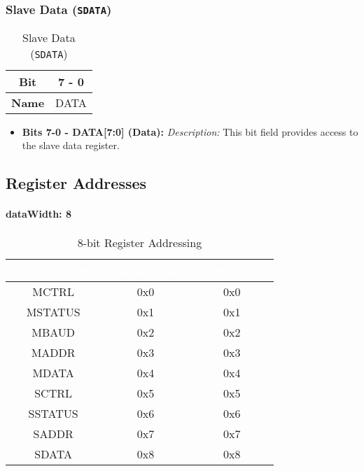       \subsubsection{Slave Data (\texttt{SDATA})}
      \label{sec:sdata}
    
      \begin{table}[H]
        \centering
        \caption{Slave Data (\texttt{SDATA})}
        \begin{tabular}{@{}cc@{}}
            \toprule
            \textbf{Bit} & 7 - 0 \\ \midrule
            \textbf{Name} & DATA \\ \bottomrule
        \end{tabular}
        \label{tab:sdata}
      \end{table}
    
      \begin{itemize}
        
        \item \textbf{Bits 7-0 - DATA[7:0] (Data):} 
        \textit{Description:} This bit field provides access to the slave data register.
      \end{itemize}
  
  \subsection{Register Addresses}
  
  \paragraph{dataWidth: 8}
  \begin{table}[H]
    \centering
    \begin{tabular}{|c|c|c|}
        \hline
        \rowcolor{darkgray}  %
        \textcolor{white}{\textbf{Register Name}} & \textcolor{white}{\textbf{Address Start}} & \textcolor{white}{\textbf{Address End}} \\ \hline
        MCTRL & 0x0 & 0x0 \\ \hline
        MSTATUS & 0x1 & 0x1 \\ \hline
        MBAUD & 0x2 & 0x2 \\ \hline
        MADDR & 0x3 & 0x3 \\ \hline
        MDATA & 0x4 & 0x4 \\ \hline
        SCTRL & 0x5 & 0x5 \\ \hline
        SSTATUS & 0x6 & 0x6 \\ \hline
        SADDR & 0x7 & 0x7 \\ \hline
        SDATA & 0x8 & 0x8 \\ \hline
    \end{tabular}
    \caption{8-bit Register Addressing}
  \end{table}
  
